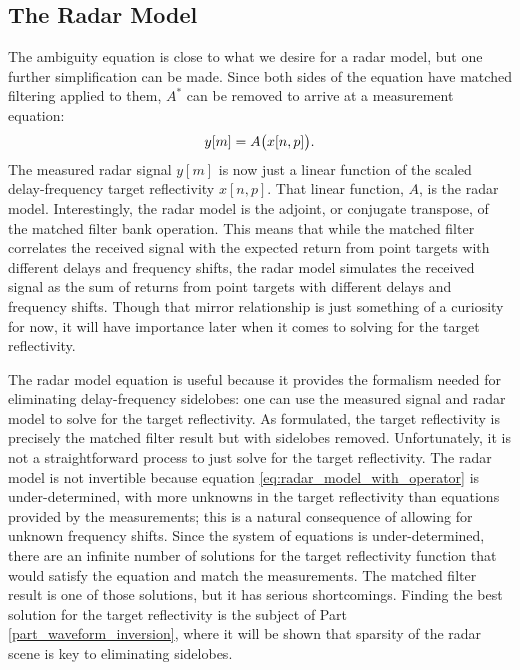 \subsection{The Radar Model}
The ambiguity equation is close to what we desire for a radar model, but one further simplification can be made. Since both sides of the equation have matched filtering applied to them, $A^*$ can be removed to arrive at a measurement equation:
\begin{equation}\label{eq:radar_model_with_operator}
 y[m] = A\paren[\big]{x[n,p]}.
\end{equation}
The measured radar signal $y[m]$ is now just a linear function of the scaled delay-frequency target reflectivity $x[n,p]$. That linear function, $A$, is the radar model. Interestingly, the radar model is the adjoint, or conjugate transpose, of the matched filter bank operation. This means that while the matched filter correlates the received signal with the expected return from point targets with different delays and frequency shifts, the radar model simulates the received signal as the sum of returns from point targets with different delays and frequency shifts. Though that mirror relationship is just something of a curiosity for now, it will have importance later when it comes to solving for the target reflectivity.

The radar model equation is useful because it provides the formalism needed for eliminating delay-frequency sidelobes: one can use the measured signal and radar model to solve for the target reflectivity. As formulated, the target reflectivity is precisely the matched filter result but with sidelobes removed. Unfortunately, it is not a straightforward process to just solve for the target reflectivity. The radar model is not invertible because equation \eqref{eq:radar_model_with_operator} is under-determined, with more unknowns in the target reflectivity than equations provided by the measurements; this is a natural consequence of allowing for unknown frequency shifts. Since the system of equations is under-determined, there are an infinite number of solutions for the target reflectivity function that would satisfy the equation and match the measurements. The matched filter result is one of those solutions, but it has serious shortcomings. Finding the best solution for the target reflectivity is the subject of Part \ref{part_waveform_inversion}, where it will be shown that sparsity of the radar scene is key to eliminating sidelobes.


